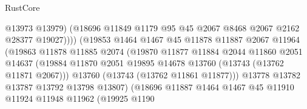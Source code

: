 \begin{lexlean}{RustCore}
\begin{coremodule}
                                        @13973
                                        @13979)
                                      (@18696
                                        @11849
                                        @1179
                                        @95
                                        @45
                                        @2067
                                        @8468
                                        @2067
                                        @2162
                                        @28377
                                        @19027))))
                                (@19853
                                  @1464
                                  @1467
                                  @45
                                  @11878
                                  @11887
                                  @2067
                                  @11964
                                  (@19863
                                    @11878
                                    @11885
                                    @2074
                                    (@19870
                                      @11877
                                      @11884
                                      @2044
                                      @11860
                                      @2051
                                      @14637
                                      (@19884
                                        @11870
                                        @2051
                                        @19895
                                        @14678
                                        @13760
                                        (@13743 (@13762 @11871 @2067)))
                                      @13760
                                      (@13743 (@13762 @11861 @11877)))
                                    @13778
                                    @13782
                                    @13787
                                    @13792
                                    @13798
                                    @13807)
                                  (@18696
                                    @11887
                                    @1464
                                    @1467
                                    @45
                                    @11910
                                    @11924
                                    @11948
                                    @11962
                                    (@19925
                                      @1190

\end{coremodule}
\end{lexlean}
